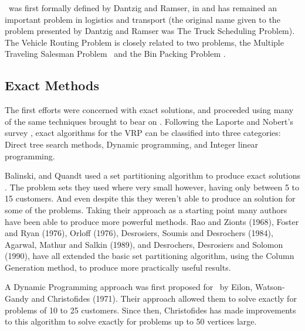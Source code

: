 
\VRP\ was first formally defined by Dantzig and Ramser, in \cite{Dantzig:1959} and has remained an important problem in logistics and transport (the original name given to the problem presented by Dantzig and Ramser was The Truck Scheduling Problem). The Vehicle Routing Problem is closely related to two problems, the Multiple Traveling Salesman Problem \MTSP\ and the Bin Packing Problem \BPP.

\subsection{Exact Methods}

The first efforts were concerned with exact solutions, and proceeded using many of the same techniques brought to bear on \TSP. 
Following the Laporte and Nobert's survey \cite{LANO:87}, exact algorithms for the VRP can be classified into three categories: Direct tree search methods, Dynamic programming, and Integer linear programming.

Balinski, and Quandt used a set partitioning algorithm to produce exact solutions \cite{balinski:64}. The problem sets they used where very small however, having only between 5 to 15 customers. And even despite this they weren't able to produce an solution for some of the problems. Taking their approach as a starting point many authors have been able to produce more powerful methods. Rao and Zionts (1968), Foster and Ryan (1976), Orloff (1976), Desrosiers, Soumis and Desrochers (1984), Agarwal, Mathur and Salkin (1989), and Desrochers, Desrosiers and Solomon (1990), have all extended the basic set partitioning algorithm, using the Column Generation method, to produce more practically useful results. 

A Dynamic Programming approach was first proposed for \VRP\ by Eilon, Watson-Gandy and Christofides (1971). Their approach allowed them to solve exactly for problems of 10 to 25 customers. Since then, Christofides has made improvements to this algorithm to solve exactly for problems up to 50 vertices large.

